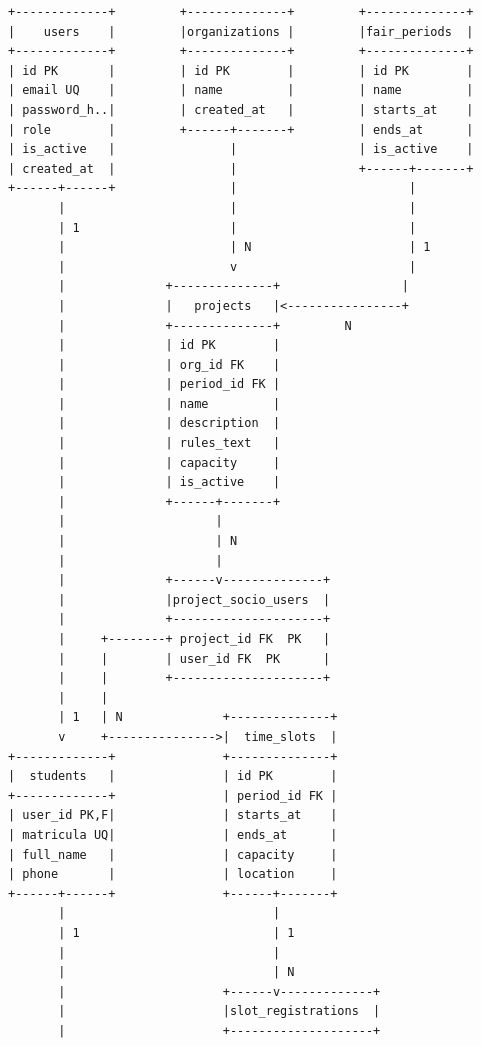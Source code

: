 \documentclass[12pt,a4paper]{article}
\begin{document}
\begin{verbatim}
+-------------+         +--------------+         +--------------+
|    users    |         |organizations |         |fair_periods  |
+-------------+         +--------------+         +--------------+
| id PK       |         | id PK        |         | id PK        |
| email UQ    |         | name         |         | name         |
| password_h..|         | created_at   |         | starts_at    |
| role        |         +------+-------+         | ends_at      |
| is_active   |                |                 | is_active    |
| created_at  |                |                 +------+-------+
+------+------+                |                        |
       |                       |                        |
       | 1                     |                        |
       |                       | N                      | 1
       |                       v                        |
       |              +--------------+                 |
       |              |   projects   |<----------------+
       |              +--------------+         N
       |              | id PK        |
       |              | org_id FK    |
       |              | period_id FK |
       |              | name         |
       |              | description  |
       |              | rules_text   |
       |              | capacity     |
       |              | is_active    |
       |              +------+-------+
       |                     |
       |                     | N
       |                     |
       |              +------v--------------+
       |              |project_socio_users  |
       |              +---------------------+
       |     +--------+ project_id FK  PK   |
       |     |        | user_id FK  PK      |
       |     |        +---------------------+
       |     |
       | 1   | N              +--------------+
       v     +--------------->|  time_slots  |
+-------------+               +--------------+
|  students   |               | id PK        |
+-------------+               | period_id FK |
| user_id PK,F|               | starts_at    |
| matricula UQ|               | ends_at      |
| full_name   |               | capacity     |
| phone       |               | location     |
+------+------+               +------+-------+
       |                             |
       | 1                           | 1
       |                             |
       |                             | N
       |                      +------v-------------+
       |                      |slot_registrations  |
       |                      +--------------------+

\end{verbatim}
\end{document}
